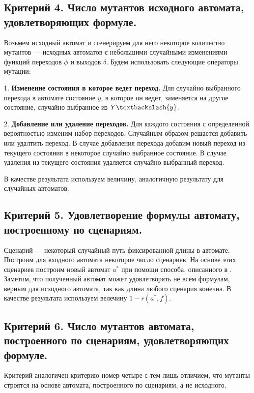\documentclass[12pt,fleqn]{article}
\begin{document}
\subsection{Критерий 4. Число мутантов исходного автомата, удовлетворяющих формуле.}

Возьмем исходный автомат и сгенерируем для него некоторое количество мутантов --- исходных автоматов с небольшими
случайными изменениями функций переходов $\phi$ и выходов $\delta$. Будем использовать следующие операторы мутации:

1. \textbf{Изменение состояния в которое ведет переход.} Для случайно выбранного перехода в автомате состояние $y$,
в которое он ведет, заменяется на другое состояние, случайно выбранное из $Y \textbackslash \{y\}$. 

2. \textbf{Добавление или удаление переходов.} Для каждого состояния с определенной вероятностью изменим набор переходов.
Случайным образом решается добавить или удалтить переход. В случае добавления перехода добавим новый переход из
текущего состояния в некоторое случайно выбранное состояние. В случае удаления из текущего состояния удаляется
случайно выбранный переход.

В качестве результата используем величину, аналогичную результату для случайных автоматов.

\subsection{Критерий 5. Удовлетворение формулы автомату, построенному по сценариям.}

Сценарий --- некоторый случайный путь фиксированной длины в автомате. Построим для входного автомата некоторое
число сценариев. На основе этих сценариев построим новый автомат $a^*$ при помощи способа, описанного в \cite{eg}.
Заметим, что полученный автомат может удовлетворять не всем формулам, верным для исходного автомата, так как
длина любого сценария конечна. В качестве результата используем велечину $1 - r(a^*, f)$.

\subsection{Критерий 6. Число мутантов автомата, построенного по сценариям, удовлетворяющих формуле.}

Критерий аналогичен критерию номер четыре с тем лишь отличием, что мутанты строятся на основе автомата, построенного по
сценариям, а не исходного.
\end{document}
